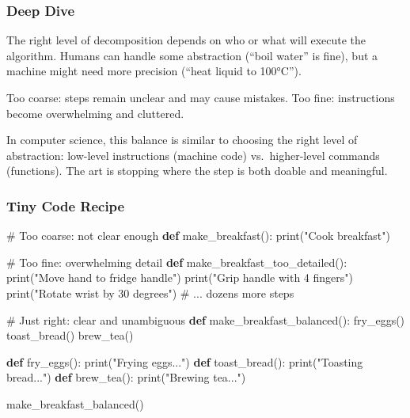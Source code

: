 \documentclass[
  letterpaper,
  DIV=11,
  numbers=noendperiod]{scrreprt}
\newenvironment{Shaded}{\begin{snugshade}}{\end{snugshade}}
\newcommand{\BuiltInTok}[1]{\textcolor[rgb]{0.00,0.23,0.31}{#1}}
\newcommand{\CommentTok}[1]{\textcolor[rgb]{0.37,0.37,0.37}{#1}}
\newcommand{\KeywordTok}[1]{\textcolor[rgb]{0.00,0.23,0.31}{\textbf{#1}}}
\newcommand{\NormalTok}[1]{\textcolor[rgb]{0.00,0.23,0.31}{#1}}
\newcommand{\StringTok}[1]{\textcolor[rgb]{0.13,0.47,0.30}{#1}}
\begin{document}
\subsubsection{Deep Dive}\label{deep-dive-4}

The right level of decomposition depends on who or what will execute the
algorithm. Humans can handle some abstraction (``boil water'' is fine),
but a machine might need more precision (``heat liquid to 100°C'').

Too coarse: steps remain unclear and may cause mistakes. Too fine:
instructions become overwhelming and cluttered.

In computer science, this balance is similar to choosing the right level
of abstraction: low-level instructions (machine code) vs.~higher-level
commands (functions). The art is stopping where the step is both doable
and meaningful.

\subsubsection{Tiny Code Recipe}\label{tiny-code-recipe-32}

\begin{Shaded}
\begin{Highlighting}[]
\CommentTok{\# Too coarse: not clear enough}
\KeywordTok{def}\NormalTok{ make\_breakfast():}
    \BuiltInTok{print}\NormalTok{(}\StringTok{"Cook breakfast"}\NormalTok{)  }

\CommentTok{\# Too fine: overwhelming detail}
\KeywordTok{def}\NormalTok{ make\_breakfast\_too\_detailed():}
    \BuiltInTok{print}\NormalTok{(}\StringTok{"Move hand to fridge handle"}\NormalTok{)}
    \BuiltInTok{print}\NormalTok{(}\StringTok{"Grip handle with 4 fingers"}\NormalTok{)}
    \BuiltInTok{print}\NormalTok{(}\StringTok{"Rotate wrist by 30 degrees"}\NormalTok{)}
    \CommentTok{\# ... dozens more steps}

\CommentTok{\# Just right: clear and unambiguous}
\KeywordTok{def}\NormalTok{ make\_breakfast\_balanced():}
\NormalTok{    fry\_eggs()}
\NormalTok{    toast\_bread()}
\NormalTok{    brew\_tea()}

\KeywordTok{def}\NormalTok{ fry\_eggs(): }\BuiltInTok{print}\NormalTok{(}\StringTok{"Frying eggs..."}\NormalTok{)}
\KeywordTok{def}\NormalTok{ toast\_bread(): }\BuiltInTok{print}\NormalTok{(}\StringTok{"Toasting bread..."}\NormalTok{)}
\KeywordTok{def}\NormalTok{ brew\_tea(): }\BuiltInTok{print}\NormalTok{(}\StringTok{"Brewing tea..."}\NormalTok{)}

\NormalTok{make\_breakfast\_balanced()}
\end{Highlighting}
\end{Shaded}
\end{document}
